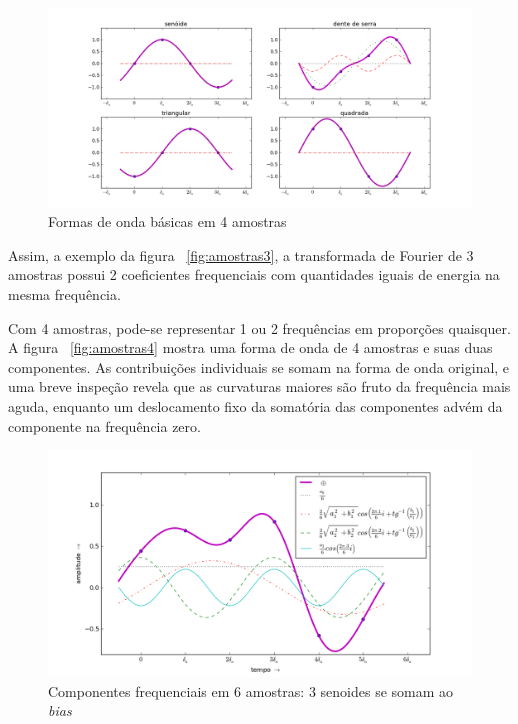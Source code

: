 \begin{figure}[h!]
    \centering
        \includegraphics[width=\textwidth]{figuras/amostras4formas__}
    \caption{Formas de onda básicas em 4 amostras}
        \label{fig:formas4}
\end{figure}


Assim, a exemplo da figura ~\ref{fig:amostras3}, a transformada de Fourier de 3 amostras possui 2 coeficientes frequenciais com quantidades iguais de energia na mesma frequência.

Com 4 amostras, pode-se representar 1 ou 2 frequências em proporções quaisquer. A figura ~\ref{fig:amostras4} mostra uma 
forma de onda de 4 amostras e suas duas componentes. 
As contribuições individuais se somam na forma de onda 
original, e uma breve inspeção revela que as curvaturas maiores são fruto da frequência mais aguda,
enquanto um deslocamento fixo da somatória das componentes advém
da componente na frequência zero.
\begin{figure}[h!]
    \centering
        \includegraphics[width=\textwidth]{figuras/amostras6}
    \caption{Componentes frequenciais em 6 amostras: 3 senoides se somam ao \emph{bias}}
        \label{fig:amostras6}
\end{figure}


